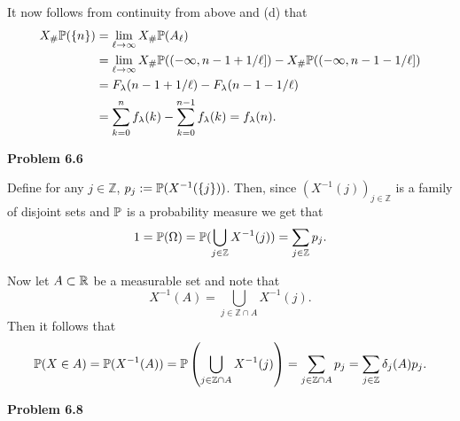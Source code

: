 \begin{enumerate}[label=(\alph*)]
It now follows from continuity from above and (d) that
\begin{align*}
	X_\#\mathbb P(\{n\}) &= \lim_{\ell \to \infty} X_\# \mathbb P(A_\ell) \\
	&= \lim_{\ell \to \infty} X_\# \mathbb P((-\infty,n-1+1/\ell])
	- X_\# \mathbb P((-\infty,n-1-1/\ell]) \\
	&= F_\lambda(n-1+1/\ell) - F_\lambda(n-1-1/\ell) \\
	&= \sum_{k = 0}^{n} f_\lambda(k) - \sum_{k = 0}^{n-1} f_\lambda(k) = f_\lambda(n).
\end{align*}
\end{enumerate}

\bigskip

\textbf{Problem 6.6}

Define for any $j \in \mathbb{Z}$, $p_j := \mathbb P(X^{-1}(\{j\}))$. Then, since $(X^{-1}(j))_{j \in \mathbb{Z}}$ is a family of disjoint sets and $\mathbb P$ is a probability measure we get that
\[
	1 = \mathbb P(\Omega) = \mathbb P(\bigcup_{j \in \mathbb{Z}} X^{-1}(j)) = \sum_{j \in \mathbb{Z}} p_j.
\]

Now let $A \subset \mathbb R$ be a measurable set and note that 
\[
	X^{-1}(A) = \bigcup_{j \in \mathbb{Z} \cap A} X^{-1}(j).
\]
Then it follows that
\[
	\mathbb P(X \in A) = \mathbb P(X^{-1}(A)) = \mathbb P\left(\bigcup_{j \in \mathbb{Z} \cap A} X^{-1}(j)\right)
	= \sum_{j \in \mathbb{Z} \cap A} p_j = \sum_{j \in \mathbb{Z}} \delta_j(A) p_j. 
\]

\bigskip

\textbf{Problem 6.8} 

